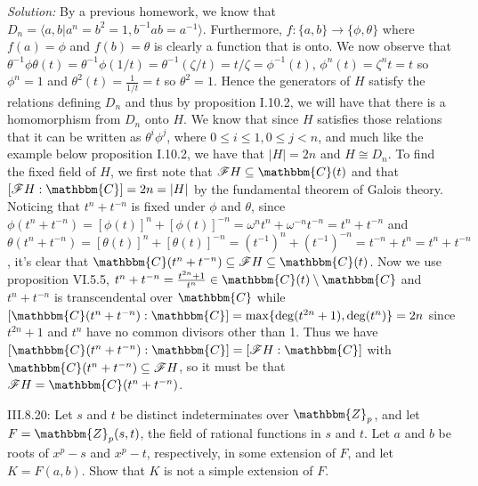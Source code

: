\documentclass{letter}
\newcommand{\tmem}[1]{{\em #1\/}}
\begin{document}
{\tmem{Solution:}} By a previous homework, we know that $D_n = \langle a, b |
a^n = b^2 = 1, b^{- 1} a b = a^{- 1} \rangle$. Furthermore, $f : \{a, b\}
\rightarrow \{\phi, \theta\}$ where $f (a) = \phi$ and $f (b) = \theta$ is
clearly a function that is onto. We now observe that $\theta^{- 1} \phi \theta
(t) = \theta^{- 1} \phi (1 / t) = \theta^{- 1} (\zeta / t) = t / \zeta =
\phi^{- 1} (t)$, $\phi^n (t) = \zeta^n t = t$ so $\phi^n = 1$ and $\theta^2
(t) = \frac{1}{1 / t} = t$ so $\theta^2 = 1$. Hence the generators of $H$
satisfy the relations defining $D_n$ and thus by proposition I.10.2, we will
have that there is a homomorphism from $D_n$ onto $H$. We know that since $H$
satisfies those relations that it can be written as $\theta^i \phi^j$, where
$0 \leq i \leq 1, 0 \leq j < n$, and much like the example below proposition
I.10.2, we have that $|H| = 2 n$ and $H \cong D_n$. To find the fixed field of
$H$, we first note that $\mathcal{F} H \subseteq \mathbbm{C}(t)$ and that $[
\mathcal{F} H : \mathbbm{C}] = 2 n = |H|$ by the fundamental theorem of Galois
theory. Noticing that $t^n + t^{- n}$ is fixed under $\phi$ and $\theta$,
since $\phi (t^n + t^{- n}) = [\phi (t)]^n + [\phi (t)]^{- n} = \omega^n t^n +
\omega^{- n} t^{- n} = t^n + t^{- n}$ and $\theta (t^n + t^{- n}) = [\theta
(t)]^n + [\theta (t)]^{- n} = (t^{- 1})^n + (t^{- 1})^{- n} = t^{- n} + t^n =
t^n + t^{- n}$ , it's clear that $\mathbbm{C}(t^n + t^{- n}) \subseteq
\mathcal{F} H \subseteq \mathbbm{C}(t)$. Now we use proposition VI.5.5, $t^n +
t^{- n} = \frac{t^{2 n} + 1}{t^n} \in \mathbbm{C}(t) \setminus \mathbbm{C}$
and $t^n + t^{- n}$ is transcendental over $\mathbbm{C}$ while
$[\mathbbm{C}(t^n + t^{- n}) : \mathbbm{C}] = \max \{\deg (t^{2 n} + 1), \deg
(t^n)\}= 2 n$ since $t^{2 n} + 1$ and $t^n$ have no common divisors other than
1. Thus we have $[\mathbbm{C}(t^n + t^{- n}) : \mathbbm{C}] = [ \mathcal{F} H
: \mathbbm{C}]$ with $\mathbbm{C}(t^n + t^{- n}) \subseteq \mathcal{F} H$, so
it must be that $\mathcal{F} H =\mathbbm{C}(t^n + t^{- n})$.

III.8.20: Let $s$ and $t$ be distinct indeterminates over $\mathbbm{Z}_p$, and
let $F =\mathbbm{Z}_p (s, t)$, the field of rational functions in $s$ and $t$.
Let $a$ and $b$ be roots of $x^p - s$ and $x^p - t$, respectively, in some
extension of $F$, and let $K = F (a, b)$. Show that $K$ is not a simple
extension of $F$.
\end{document}
